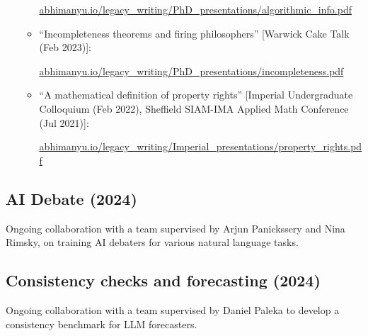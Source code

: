 \documentclass{article}
\newenvironment{relatedwork}
   {
     \begin{mdframed}[
       leftmargin=1cm,
       rightmargin=0cm,
       innerleftmargin=10pt,
       innerrightmargin=0pt,
       innertopmargin=0.5em,
       innerbottommargin=0.5em,
       linewidth=1pt,
       linecolor=gray,
       topline=false,
       bottomline=false,
       rightline=false
     ]
     \footnotesize
   }
   {
     \end{mdframed}
   }
\begin{document}
\begin{relatedwork}
\begin{itemize}[label=—]
\begin{itemize}
                        \href{https://abhimanyu.io/legacy_writing/PhD_presentations/algorithmic_info.pdf}{abhimanyu.io/legacy\_writing/PhD\_presentations/algorithmic\_info.pdf}

                  \item ``Incompleteness theorems and firing philosophers'' [Warwick Cake Talk (Feb 2023)]:

                        \href{https://abhimanyu.io/legacy_writing/PhD_presentations/incompleteness.pdf}{abhimanyu.io/legacy\_writing/PhD\_presentations/incompleteness.pdf}

                  \item ``A mathematical definition of property rights'' [Imperial Undergraduate Colloquium (Feb 2022), Sheffield SIAM-IMA Applied Math Conference (Jul 2021)]:

                        \href{https://abhimanyu.io/legacy_writing/Imperial_presentations/property_rights.pdf}{abhimanyu.io/legacy\_writing/Imperial\_presentations/property\_rights.pdf}
              \end{itemize}
    \end{itemize}
\end{relatedwork}

\subsection*{AI Debate (2024)}

Ongoing collaboration with a team supervised by Arjun Panickssery and Nina Rimsky, on training AI debaters for various natural language tasks.

\subsection*{Consistency checks and forecasting (2024)}

Ongoing collaboration with a team supervised by Daniel Paleka to develop a consistency benchmark for LLM forecasters.
\end{document}
